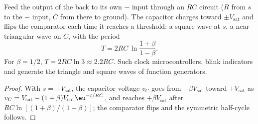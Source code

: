 \begin{proposition}\label{prop:b2:feedback-oscillators:astable}
Feed the output of the  back to its own $-$ input
through an $RC$ circuit ($R$ from $s$ to the $-$ input, $C$ from there
to ground). The capacitor charges toward $\pm V_{\text{sat}}$ and flips the
comparator each time it reaches a threshold: a square wave at $s$, a
near-triangular wave on $C$, with the period
\[
T = 2RC\,\ln\frac{1 + \beta}{1 - \beta} .
\]
For $\beta = 1/2$, $T = 2RC\ln3 \approx 2.2RC$. Such \emph{} clock microcontrollers, blink indicators and generate
the triangle and square waves of function generators.
\end{proposition}

\begin{proof}
With $s = +V_{\text{sat}}$, the capacitor voltage $v_C$ goes from
$-\beta V_{\text{sat}}$ toward $+V_{\text{sat}}$ as $v_C = V_{\text{sat}} - (1 + \beta)
V_{\text{sat}}\eu^{-t/RC}$, and reaches $+\beta V_{\text{sat}}$ after $RC\ln[(1 + \beta)
/(1 - \beta)]$; the comparator flips and the symmetric half-cycle follows.
\end{proof}

